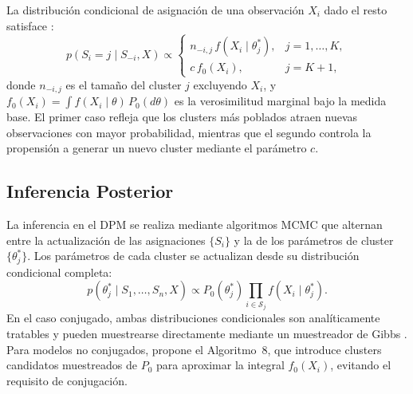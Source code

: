 La distribución condicional de asignación de una observación $X_i$ dado el resto satisface \citep{02_05_escobar1995bayesian}:
\begin{equation}
    p(S_i = j \mid S_{-i}, X) \propto
    \begin{cases}
        n_{-i,j}\, f(X_i \mid \theta_j^*), & j = 1, \dots, K, \\
        c\, f_0(X_i),                      & j = K + 1,
    \end{cases}
\end{equation}
donde $n_{-i,j}$ es el tamaño del cluster $j$ excluyendo $X_i$, y $f_0(X_i) = \int f(X_i \mid \theta)\, P_0(d\theta)$ es la verosimilitud marginal bajo la medida base. El primer caso refleja que los clusters más poblados atraen nuevas observaciones con mayor probabilidad, mientras que el segundo controla la propensión a generar un nuevo cluster mediante el parámetro $c$.
\subsection{Inferencia Posterior}
\label{02_05_03_inferencia}
La inferencia en el DPM se realiza mediante algoritmos MCMC que alternan entre la actualización de las asignaciones $\{S_i\}$ y la de los parámetros de cluster $\{\theta_j^*\}$. Los parámetros de cada cluster se actualizan desde su distribución condicional completa:
\begin{equation}
    p(\theta_j^* \mid S_1, \dots, S_n, X) \propto P_0(\theta_j^*)
    \prod_{i \in \mathcal{S}_j} f(X_i \mid \theta_j^*).
\end{equation}
En el caso conjugado, ambas distribuciones condicionales son analíticamente tratables y pueden muestrearse directamente mediante un muestreador de Gibbs \citep{02_05_escobar1995bayesian}. Para modelos no conjugados, \citet{02_05_neal2000markov} propone el Algoritmo~8, que introduce clusters candidatos muestreados de $P_0$ para aproximar la integral $f_0(X_i)$, evitando el requisito de conjugación.

